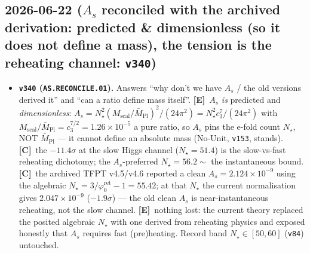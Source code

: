 \documentclass[11pt]{article}
\providecommand{\mE}{\textbf{[E]}}\providecommand{\mC}{\textbf{[C]}}
\providecommand{\vref}[1]{\texttt{#1}}
\providecommand{\cthree}{c_3}\providecommand{\phiz}{\varphi_0^{\mathrm{ret}}}
\begin{document}
\subsection*{2026-06-22 ($A_s$ reconciled with the archived derivation: predicted \& dimensionless (so it does not define a mass), the tension is the reheating channel: \texttt{v340})}
\begin{itemize}
\item \textbf{\texttt{v340} (\texttt{AS.RECONCILE.01}).} Answers ``why don't we have $A_s$ / the old versions
derived it'' and ``can a ratio define mass itself''. \mE\ $A_s$ \emph{is} predicted and \emph{dimensionless}:
$A_s=N_\star^2(M_{\mathrm{scal}}/\bar M_{\mathrm{Pl}})^2/(24\pi^2)=N_\star^2\cthree^7/(24\pi^2)$ with
$M_{\mathrm{scal}}/\bar M_{\mathrm{Pl}}=\cthree^{7/2}=1.26\times10^{-5}$ a pure ratio, so $A_s$ pins the e-fold
count $N_\star$, NOT $\bar M_{\mathrm{Pl}}$ --- it cannot define an absolute mass (No-Unit, \vref{v153}, stands).
\mC\ the $-11.4\sigma$ at the slow Higgs channel ($N_\star{=}51.4$) is the slow-vs-fast reheating dichotomy;
the $A_s$-preferred $N_\star{=}56.2\sim$ the instantaneous bound. \mC\ the archived TFPT v4.5/v4.6 reported a clean
$A_s=2.124\times10^{-9}$ using the algebraic $N_\star=3/\phiz-1=55.42$; at that $N_\star$ the current normalisation
gives $2.047\times10^{-9}$ ($-1.9\sigma$) --- the old clean $A_s$ is near-instantaneous reheating, not the slow
channel. \mE\ nothing lost: the current theory replaced the posited algebraic $N_\star$ with one derived from
reheating physics and exposed honestly that $A_s$ requires fast (pre)heating. Record band $N_\star\in[50,60]$
(\vref{v84}) untouched.
\end{itemize}
\end{document}
